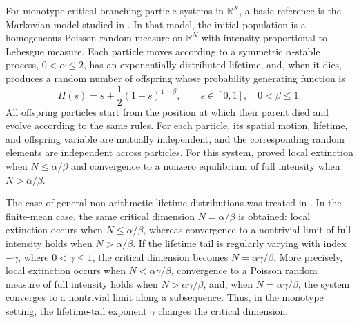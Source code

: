 \documentclass[reqno,final,11pt]{amsart}
\newcommand{\R}{\mathbb R}
\theoremstyle{plain}
\theoremstyle{definition}
\theoremstyle{remark}
\numberwithin{equation}{section}
\begin{document}
For monotype critical branching particle systems in \(\R^N\), a basic reference is the Markovian model studied in \cite{GW}. In that model, the initial population is a homogeneous Poisson random measure on \(\R^N\) with intensity proportional to Lebesgue measure. Each particle moves according to a symmetric \(\alpha\)-stable process, \(0<\alpha\le2\), has an exponentially distributed lifetime, and, when it dies, produces a random number of offspring whose probability generating function is
\[
  H(s)=s+\frac12(1-s)^{1+\beta},
  \qquad s\in[0,1],\quad 0<\beta\le1.
\]
All offspring particles start from the position at which their parent died and evolve according to the same rules. For each particle, its spatial motion, lifetime, and offspring variable are mutually independent, and the corresponding random elements are independent across particles. For this system, \cite{GW} proved local extinction when \(N\le\alpha/\beta\) and convergence to a nonzero equilibrium of full intensity when \(N>\alpha/\beta\).

The case of general non-arithmetic lifetime distributions was treated in \cite{VW}. In the finite-mean case, the same critical dimension \(N=\alpha/\beta\) is obtained: local extinction occurs when \(N\le\alpha/\beta\), whereas convergence to a nontrivial limit of full intensity holds when \(N>\alpha/\beta\). If the lifetime tail is regularly varying with index \(-\gamma\), where \(0<\gamma\le1\), the critical dimension becomes \(N=\alpha\gamma/\beta\). More precisely, local extinction occurs when \(N<\alpha\gamma/\beta\), convergence to a Poisson random measure of full intensity holds when \(N>\alpha\gamma/\beta\), and, when \(N=\alpha\gamma/\beta\), the system converges to a nontrivial limit along a subsequence. Thus, in the monotype setting, the lifetime-tail exponent \(\gamma\) changes the critical dimension.
\end{document}

